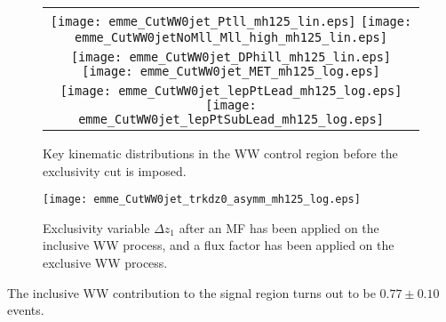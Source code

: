 \begin{figure}[!h]
\centering
\begin{tabular}{c}
	\texttt{[image: emme\_CutWW0jet\_Ptll\_mh125\_lin.eps]}
	\texttt{[image: emme\_CutWW0jetNoMll\_Mll\_high\_mh125\_lin.eps]}\\
	\texttt{[image: emme\_CutWW0jet\_DPhill\_mh125\_lin.eps]}
	\texttt{[image: emme\_CutWW0jet\_MET\_mh125\_log.eps]}\\
	\texttt{[image: emme\_CutWW0jet\_lepPtLead\_mh125\_log.eps]}
	\texttt{[image: emme\_CutWW0jet\_lepPtSubLead\_mh125\_log.eps]}\\
\end{tabular}
\caption{Key kinematic distributions in the WW control region before the exclusivity cut is imposed.}
\label{fig:wwCR}
\end{figure}

\begin{figure}[!h]
\centering
	\texttt{[image: emme\_CutWW0jet\_trkdz0\_asymm\_mh125\_log.eps]}
\caption{Exclusivity variable $\Delta z_1$ after an MF has been applied on the inclusive WW process, 
and a flux factor has been applied on the exclusive WW process.}
\label{fig:exclwwCR}
\end{figure}

\begin{table}
\centering
\caption{Estimated and observed events in the WW CR.}
\label{table:wwCR}
\end{table}

\par The inclusive WW contribution to the signal region turns out to be $0.77\pm0.10$ events.

